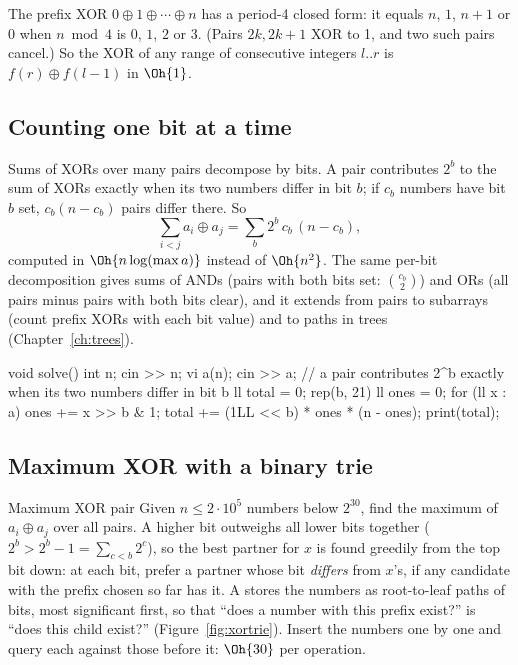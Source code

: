 \begin{trick}
The prefix XOR $0 \oplus 1 \oplus \cdots \oplus n$ has a period-4 closed form: it equals $n$, $1$, $n + 1$ or $0$ when
$n \bmod 4$ is $0$, $1$, $2$ or $3$. (Pairs $2k, 2k+1$ XOR to 1, and two such pairs cancel.) So the XOR of any range of
consecutive integers $l..r$ is $f(r) \oplus f(l - 1)$ in $\Oh{1}$.
\end{trick}

\subsection{Counting one bit at a time}

Sums of XORs over many pairs decompose by bits. A pair contributes $2^b$ to the sum of XORs exactly when its two numbers
differ in bit $b$; if $c_b$ numbers have bit $b$ set, $c_b(n - c_b)$ pairs differ there. So
\[
  \sum_{i < j} a_i \oplus a_j = \sum_b 2^b\, c_b\,(n - c_b) ,
\]
computed in $\Oh{n \log(\max a)}$ instead of $\Oh{n^2}$. The same per-bit decomposition gives sums of ANDs (pairs with both
bits set: $\binom{c_b}{2}$) and ORs (all pairs minus pairs with both bits clear), and it extends from pairs to subarrays (count
prefix XORs with each bit value) and to paths in trees (Chapter~\ref{ch:trees}).

\begin{code}
void solve() {
    int n;
    cin >> n;
    vi a(n);
    cin >> a;
    // a pair contributes 2^b exactly when its two numbers differ in bit b
    ll total = 0;
    rep(b, 21) {
        ll ones = 0;
        for (ll x : a) ones += x >> b & 1;
        total += (1LL << b) * ones * (n - ones);
    }
    print(total);
}
\end{code}

\subsection{Maximum XOR with a binary trie}

\begin{problem}{Maximum XOR pair}
Given $n \le 2\cdot10^5$ numbers below $2^{30}$, find the maximum of $a_i \oplus a_j$ over all pairs.
\solution A higher bit outweighs all lower bits together ($2^b > 2^b - 1 = \sum_{c < b} 2^c$), so the best partner for $x$ is
found greedily from the top bit down: at each bit, prefer a partner whose bit \emph{differs} from $x$'s, if any candidate with
the prefix chosen so far has it. A  stores the numbers as root-to-leaf paths of bits, most significant first,
so that ``does a number with this prefix exist?'' is ``does this child exist?'' (Figure~\ref{fig:xortrie}). Insert the numbers
one by one and query each against those before it: $\Oh{30}$ per operation.
\end{problem}

